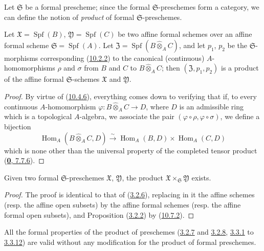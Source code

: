 \begin{env}[10.7.1]
\label{I.10.7.1}
Let $\mathfrak{S}$ be a formal prescheme; since the formal
$\mathfrak{S}$-preschemes form a category, we can define the notion of
\emph{product} of formal $\mathfrak{S}$-preschemes.
\end{env}

\begin{proposition}[10.7.2]
\label{I.10.7.2}
Let $\mathfrak{X}=\operatorname{Spf}(B)$,
$\mathfrak{Y}=\operatorname{Spf}(C)$ be two affine formal schemes
over an affine formal scheme
$\mathfrak{S}=\operatorname{Spf}(A)$. Let
$\mathfrak{Z}=\operatorname{Spf}(B\widehat{\otimes}_A C)$, and let
$p_1$, $p_2$ be the $\mathfrak{S}$-morphisms corresponding
\textup{(\hyperref[I.10.2.2]{10.2.2})} to the canonical (continuous)
$A$-homomorphisms $\rho$ and $\sigma$ from $B$ and $C$ to
$B\widehat{\otimes}_A C$; then $(\mathfrak{Z},p_1,p_2)$ is a product
of the affine formal $\mathfrak{S}$-schemes $\mathfrak{X}$ and
$\mathfrak{Y}$.
\end{proposition}

\begin{proof}
By virtue of (\hyperref[I.10.4.6]{10.4.6}), everything comes down to
verifying that if, to every continuous $A$-homomorphism
$\varphi:B\widehat{\otimes}_A C\to D$, where $D$ is an admissible ring
which is a topological $A$-algebra, we associate the pair
$(\varphi\circ\rho,\varphi\circ\sigma)$, we define a bijection
\[
  \operatorname{Hom}_A(B\widehat{\otimes}_A C,D)
  \xrightarrow{\sim}
  \operatorname{Hom}_A(B,D)\times\operatorname{Hom}_A(C,D)
\]
which is none other than the universal property of the completed
tensor product (\hyperref[0.7.7.6]{\textbf{0}, 7.7.6}).
\end{proof}

\begin{proposition}[10.7.3]
\label{I.10.7.3}
Given two formal $\mathfrak{S}$-preschemes
$\mathfrak{X}$, $\mathfrak{Y}$, the product
$\mathfrak{X}\times_{\mathfrak{S}}\mathfrak{Y}$ exists.
\end{proposition}

\begin{proof}
The proof is identical to that of
(\hyperref[I.3.2.6]{3.2.6}), replacing in it the affine schemes
(resp. the affine open subsets) by the affine formal schemes (resp. the
affine formal open subsets), and Proposition
(\hyperref[I.3.2.2]{3.2.2}) by
(\hyperref[I.10.7.2]{10.7.2}).
\end{proof}

All the formal properties of the product of preschemes
(\hyperref[I.3.2.7]{3.2.7} and
\hyperref[I.3.2.8]{3.2.8},
\hyperref[I.3.3.1]{3.3.1} to
\hyperref[I.3.3.12]{3.3.12}) are valid without any modification
for the product of formal preschemes.

